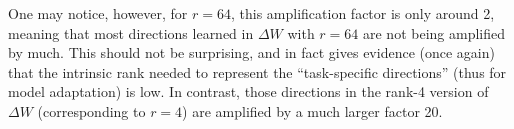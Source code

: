 \documentclass{article} %
\begin{document}
One may notice, however, for $r=64$, this amplification factor is only around 2, meaning that most directions learned in $\Delta W$ with $r=64$ are not being amplified by much.
This should not be surprising, and in fact gives evidence (once again) that the intrinsic rank needed to represent the ``task-specific directions'' (thus for model adaptation) is low.
In contrast, those directions in the rank-4 version of $\Delta W$ (corresponding to $r=4$) are amplified by a much larger factor 20.
\end{document}
